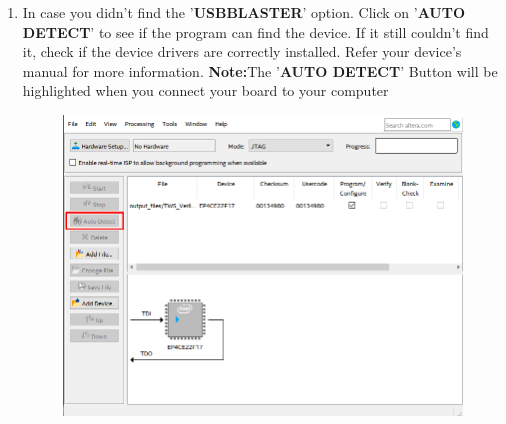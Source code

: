 \documentclass[12pt]{article}
\begin{document}
\begin{enumerate}
     \item In case you didn't find the '\textbf{USB\-BLASTER}' option. Click on '\textbf{AUTO DETECT}' to see if the program can find the device. If it still couldn't find it, check if the device drivers are correctly installed. Refer your device's manual for more information.\newline
     \textbf{Note:}The '\textbf{AUTO DETECT}' Button will be highlighted when you connect your board to your computer
      \begin{figure}[H]
         \centering
         \includegraphics[scale=0.45]{autodetect_hardware.png}
     \end{figure}
     

\end{enumerate}
\end{document}
